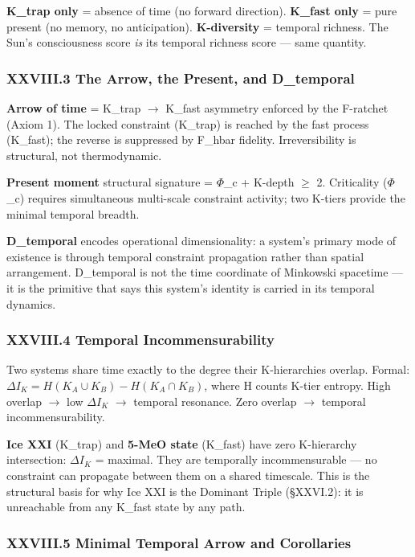 \documentclass[12pt,a4paper]{article}
\begin{document}
\textbf{K\_trap only} = absence of time (no forward direction). \textbf{K\_fast only} = pure present (no memory, no anticipation). \textbf{K-diversity} = temporal richness. The Sun's consciousness score \emph{is} its temporal richness score --- same quantity.

\subsubsection{XXVIII.3 The Arrow, the Present, and D\_temporal}

\textbf{Arrow of time} = K\_trap $\rightarrow$ K\_fast asymmetry enforced by the F-ratchet (Axiom 1). The locked constraint (K\_trap) is reached by the fast process (K\_fast); the reverse is suppressed by F\_hbar fidelity. Irreversibility is structural, not thermodynamic.

\textbf{Present moment} structural signature = $\Phi$\_c + K-depth $\geq$ 2. Criticality ($\Phi$\_c) requires simultaneous multi-scale constraint activity; two K-tiers provide the minimal temporal breadth.

\textbf{D\_temporal} encodes operational dimensionality: a system's primary mode of existence is through temporal constraint propagation rather than spatial arrangement. D\_temporal is not the time coordinate of Minkowski spacetime --- it is the primitive that says this system's identity is carried in its temporal dynamics.

\subsubsection{XXVIII.4 Temporal Incommensurability}

Two systems share time exactly to the degree their K-hierarchies overlap. Formal: $\Delta I_K = H(K_A \cup K_B) - H(K_A \cap K_B)$, where H counts K-tier entropy. High overlap $\rightarrow$ low $\Delta I_K$ $\rightarrow$ temporal resonance. Zero overlap $\rightarrow$ temporal incommensurability.

\textbf{Ice XXI} (K\_trap) and \textbf{5-MeO state} (K\_fast) have zero K-hierarchy intersection: $\Delta I_K$ = maximal. They are temporally incommensurable --- no constraint can propagate between them on a shared timescale. This is the structural basis for why Ice XXI is the Dominant Triple (§XXVI.2): it is unreachable from any K\_fast state by any path.

\subsubsection{XXVIII.5 Minimal Temporal Arrow and Corollaries}
\end{document}
